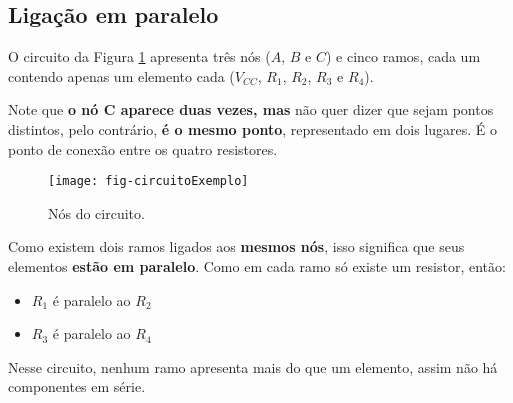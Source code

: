 \subsection{Ligação em paralelo}

O circuito da Figura \ref{fig:CircuitoExemplo} apresenta três nós ($A$, $B$ e $C$) e cinco ramos, cada um contendo apenas um elemento cada ($V_{CC}$, $R_1$, $R_2$, $R_3$ e $R_4$).

\begin{minipage}{\linewidth}
  \centering
  \begin{minipage}{0.45\linewidth}
    Note que \textbf{o nó C aparece duas vezes, mas} não quer dizer que sejam pontos distintos, pelo contrário, \textbf{é o mesmo ponto}, representado em dois lugares. É o ponto de conexão entre os quatro resistores.
  \end{minipage}
  \hspace{0.05\linewidth}
  \begin{minipage}{0.45\linewidth}
    \begin{figure}[H]
      \centering
      \caption{Nós do circuito.}
      \label{fig:CircuitoExemplo}
      \texttt{[image: fig-circuitoExemplo]}
%
    \end{figure}
  \end{minipage}
\end{minipage}

Como existem dois ramos ligados aos \textbf{mesmos nós}, isso significa que seus elementos \textbf{estão em paralelo}. Como em cada ramo só existe um resistor, então:

\begin{itemize}
  \item $R_1$ é paralelo ao $R_2$
  \item $R_3$ é paralelo ao $R_4$
\end{itemize}

Nesse circuito, nenhum ramo apresenta mais do que um elemento, assim não há componentes em série.
